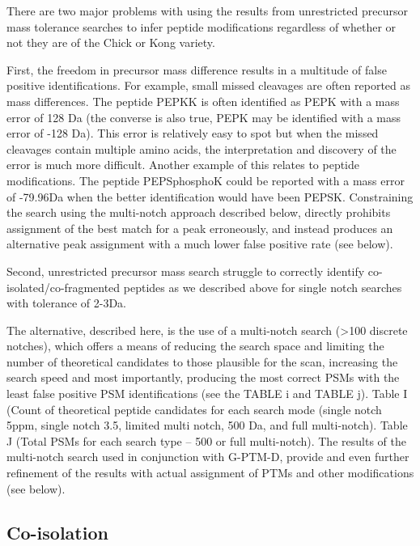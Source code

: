 \documentclass[journal=jprobs,manuscript=article]{achemso}
\begin{document}
There are two major problems with using the results from unrestricted precursor mass tolerance searches to infer peptide modifications regardless of whether or not they are of the Chick or Kong variety.

First, the freedom in precursor mass difference results in a multitude of false positive identifications.
For example, small missed cleavages are often reported as mass differences.
The peptide PEPKK is often identified as PEPK with a mass error of 128 Da (the converse is also true, PEPK may be identified with a mass error of -128 Da).
This error is relatively easy to spot but when the missed cleavages contain multiple amino acids, the interpretation and discovery of the error is much more difficult.
Another example of this relates to peptide modifications.
The peptide PEPSphosphoK could be reported with a mass error of -79.96Da when the better identification would have been PEPSK.
Constraining the search using the multi-notch approach described below, directly prohibits assignment of the best match for a peak erroneously, and instead produces an alternative peak assignment with a much lower false positive rate (see below).

Second, unrestricted precursor mass search struggle to correctly identify co-isolated/co-fragmented peptides as we described above for single notch searches with tolerance of 2-3Da.

The alternative, described here, is the use of a multi-notch search (>100 discrete notches), which offers a means of reducing the search space and limiting the number of theoretical candidates to those plausible for the scan, increasing the search speed and most importantly, producing the most correct PSMs with the least false positive PSM identifications (see the TABLE i and TABLE j).
Table I (Count of theoretical peptide candidates for each search mode (single notch 5ppm, single notch 3.5, limited multi notch, 500 Da, and full multi-notch).
Table J (Total PSMs for each search type – 500 or full multi-notch).
The results of the multi-notch search used in conjunction with G-PTM-D, provide and even further refinement of the results with actual assignment of PTMs and other modifications (see below). 

\subsection{Co-isolation}
\end{document}

